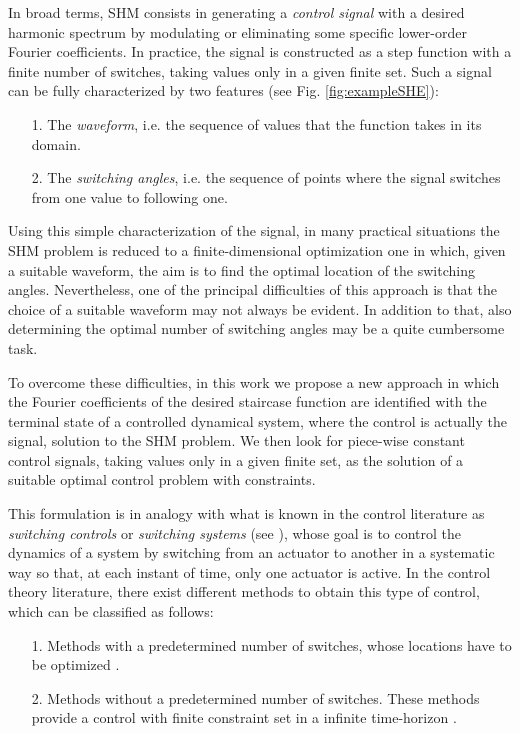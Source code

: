 \documentclass[twocolumn]{autart}    %
\begin{document}
In broad terms, SHM consists in generating a \textit{control signal} with a desired harmonic spectrum by modulating or eliminating some specific lower-order Fourier coefficients. In practice, the signal is constructed as a step function with a finite number of switches, taking values only in a given finite set. Such a signal can be fully characterized by two features (see Fig. \ref{fig:exampleSHE}): 
\begin{itemize}
	\item[1.] The \textit{waveform}, i.e. the sequence of values that the function takes in its domain.
	\item[2.] The \textit{switching angles}, i.e. the sequence of points where the signal switches from one value to following one. 
\end{itemize}

Using this simple characterization of the signal, in many practical situations the SHM problem is reduced to a finite-dimensional optimization one in which, given a suitable waveform, the aim is to find the optimal location of the switching angles. Nevertheless, one of the principal difficulties of this approach is that the choice of a suitable waveform may not always be evident. In addition to that, also determining the optimal number of switching angles may be a quite cumbersome task. 
 
To overcome these difficulties, in this work we propose a new approach in which the Fourier coefficients of the desired staircase function are identified with the terminal state of a controlled dynamical system, where the control is actually the signal, solution to the SHM problem. We then look for piece-wise constant control signals, taking values only in a given finite set, as the solution of a suitable optimal control problem with constraints. 

This formulation is in analogy with what is known in the control literature as \textit{switching controls} or \textit{switching systems} (see \cite{liberzon2003switching,Zuazua2011, liu2014optimal}), whose goal is to control the dynamics of a system by switching from an actuator to another in a systematic way so that, at each instant of time, only one actuator is active. In the control theory literature, there exist different methods to obtain this type of control, which can be classified as follows:
\begin{enumerate}
	\item [1.] Methods with a predetermined number of switches, whose locations have to be optimized \cite{Xu2002}.
	\item [2.] Methods without a predetermined number of switches. These methods provide a control with finite constraint set in a infinite time-horizon \cite{Quevedo2004}.
\end{enumerate} 
\end{document}
